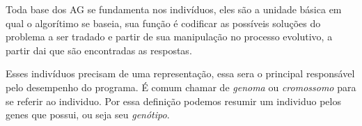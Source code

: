 \begin{minipage}{\linewidth}
\end{minipage}

Toda base dos AG se fundamenta nos indivíduos, eles são a unidade básica em qual o algorítimo se baseia, sua função é codificar as possíveis soluções do problema a ser tradado e partir de sua manipulação no processo evolutivo, a partir dai que são encontradas as respostas.

Esses indivíduos precisam de uma representação, essa sera o principal responsável pelo desempenho do programa. É comum chamar de \textit{genoma} ou \textit{cromossomo} para se referir ao individuo. Por essa definição podemos resumir um individuo pelos genes que possui, ou seja seu \textit{genótipo}.

